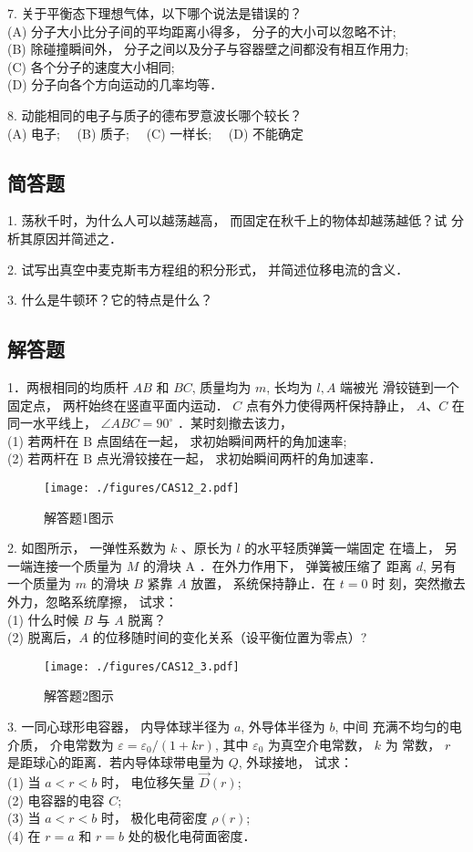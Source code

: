 7. 关于平衡态下理想气体，以下哪个说法是错误的？\\
(A) 分子大小比分子间的平均距离小得多， 分子的大小可以忽略不计;\\
(B) 除碰撞瞬间外， 分子之间以及分子与容器壁之间都没有相互作用力;\\
(C) 各个分子的速度大小相同;\\
(D) 分子向各个方向运动的几率均等．

8. 动能相同的电子与质子的德布罗意波长哪个较长？\\
(A) 电子;$\quad$
(B) 质子;$\quad$
(C) 一样长;$\quad$
(D) 不能确定

\subsection{简答题}

1. 荡秋千时，为什么人可以越荡越高， 而固定在秋千上的物体却越荡越低？试 分析其原因并简述之．

2. 试写出真空中麦克斯韦方程组的积分形式， 并简述位移电流的含义．

3. 什么是牛顿环？它的特点是什么？
\subsection{解答题}
1．两根相同的均质杆 $A B$ 和 $B C$, 质量均为 $m$, 长均为 $l, A$ 端被光 滑铰链到一个固定点， 两杆始终在竖直平面内运动． $C$ 点有外力使得两杆保持静止， $A $、$ C$ 在同一水平线上， $\angle A B C=90^{\circ}$ ．某时刻撤去该力，\\
(1) 若两杆在 $\mathrm{B}$ 点固结在一起， 求初始瞬间两杆的角加速率;\\
(2) 若两杆在 $\mathrm{B}$ 点光滑铰接在一起， 求初始瞬间两杆的角加速率．
\begin{figure}[ht]
\centering
\texttt{[image: ./figures/CAS12\_2.pdf]}
\caption{解答题1图示} \label{CAS12_fig2}
\end{figure}

2. 如图所示， 一弹性系数为 $k$ 、原长为 $l$ 的水平轻质弹簧一端固定 在墙上， 另一端连接一个质量为 $M$ 的滑块 $\mathrm{A}$ ．在外力作用下， 弹簧被压缩了 距离 $d$, 另有一个质量为 $m$ 的滑块 $B$ 紧靠 $A$ 放置， 系统保持静止．在 $t=0$ 时 刻，突然撤去外力，忽略系统摩擦， 试求：\\
(1) 什么时候 $B$ 与 $A$ 脱离？\\
(2) 脱离后，$A$ 的位移随时间的变化关系（设平衡位置为零点）?
\begin{figure}[ht]
\centering
\texttt{[image: ./figures/CAS12\_3.pdf]}
\caption{解答题2图示} \label{CAS12_fig3}
\end{figure}
3. 一同心球形电容器， 内导体球半径为 $a$, 外导体半径为 $b$, 中间 充满不均匀的电介质， 介电常数为 $\varepsilon=\varepsilon_{0} /(1+k r)$, 其中 $\varepsilon_{0}$ 为真空介电常数， $k$ 为 常数， $r$ 是距球心的距离．若内导体球带电量为 $Q$, 外球接地， 试求：\\
(1) 当 $a<r< b$ 时， 电位移矢量 $\vec{D}(r)$; \\
(2) 电容器的电容 $C$; \\
(3) 当 $a<r< b$ 时， 极化电荷密度 $\rho(r)$; \\
(4) 在 $r=a$ 和 $r=b$ 处的极化电荷面密度．

